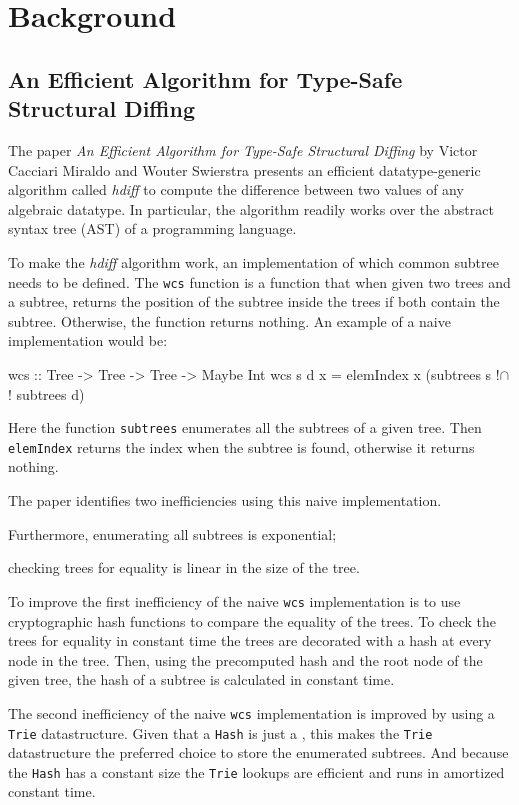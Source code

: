\section{Background}

\subsection{An Efficient Algorithm for Type-Safe Structural Diffing}
The paper \textit{An Efficient Algorithm for Type-Safe Structural Diffing} by Victor Cacciari Miraldo and Wouter Swierstra presents an efficient datatype-generic algorithm called \textit{hdiff} to compute the difference between two values of any algebraic datatype. In particular, the algorithm readily works over the abstract syntax tree (AST) of a programming language\cite{miraldo2019efficient}.

To make the \textit{hdiff} algorithm work, an implementation of which common subtree needs to be defined. The \texttt{wcs} function is a function that when given two trees and a subtree, returns the position of the subtree inside the trees if both contain the subtree. Otherwise, the function returns nothing. An example of a naive implementation would be:

\begin{haskell}
wcs :: Tree -> Tree -> Tree -> Maybe Int
wcs s d x = elemIndex x (subtrees s !$\cap$! subtrees d) 
\end{haskell}

Here the function \texttt{subtrees} enumerates all the subtrees of a given tree. Then \texttt{elemIndex} returns the index when the subtree is found, otherwise it returns nothing. 

The paper identifies two inefficiencies using this naive implementation.
\begin{enumerate*}[label=(\Alph*)]
    \item Furthermore, enumerating all subtrees is exponential;
    \item checking trees for equality is linear in the size of the tree.
\end{enumerate*}

To improve the first inefficiency of the naive \texttt{wcs} implementation is to use cryptographic hash functions to compare the equality of the trees. To check the trees for equality in constant time the trees are decorated with a hash at every node in the tree. Then, using the precomputed hash and the root node of the given tree, the hash of a subtree is calculated in constant time.

The second inefficiency of the naive \texttt{wcs} implementation is improved by using a \texttt{Trie}\cite{brass2008trie} datastructure. Given that a \texttt{Hash} is just a \inlinehaskell{[Char]}, this makes the \texttt{Trie} datastructure the preferred choice to store the enumerated subtrees. And because the \texttt{Hash} has a constant size the \texttt{Trie} lookups are efficient and runs in amortized constant time.

